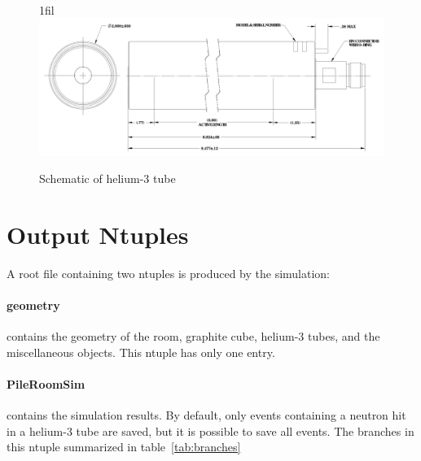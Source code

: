 \documentclass{article}
\makeatletter
\newcommand*{\centerfloat}{%
  \parindent \z@
  \leftskip \z@ \@plus 1fil \@minus \textwidth
  \rightskip\leftskip
  \parfillskip \z@skip}
\makeatother
\begin{document}
\begin{figure}[htb]
	\centerfloat
	\includegraphics[width=\columnwidth]{images/GESchematic.pdf}
	\caption{Schematic of helium-3 tube}	
	\label{fig:tubeSchematic}
\end{figure}


\section{Output Ntuples}

	A root file containing two ntuples is produced by the simulation:

	\paragraph{geometry} contains the geometry of the room, graphite cube, helium-3 tubes, and the miscellaneous objects. This ntuple has only one entry.

	\paragraph{PileRoomSim} contains the simulation results. By default, only events containing a neutron hit in a helium-3 tube are saved, but it is possible to save all events. The branches in this ntuple summarized in table~\ref{tab:branches}
\end{document}
